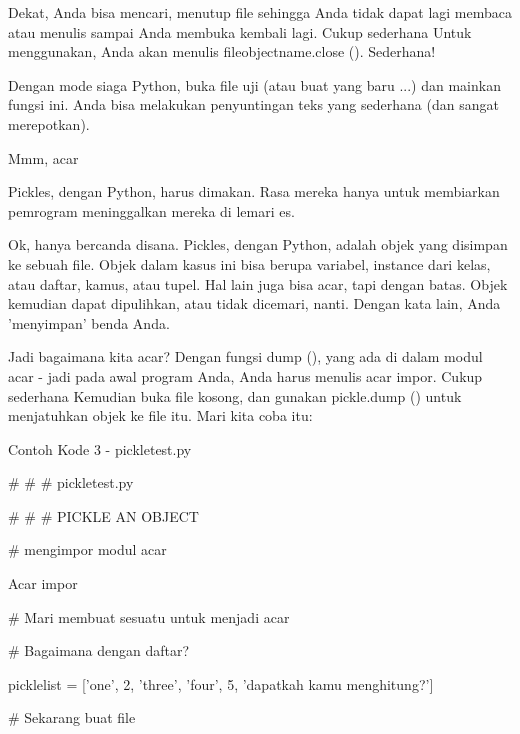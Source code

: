 \vspace{12pt}
Dekat, Anda bisa mencari, menutup file sehingga Anda tidak dapat lagi membaca atau menulis sampai Anda membuka kembali lagi. Cukup sederhana Untuk menggunakan, Anda akan menulis fileobjectname.close (). Sederhana! \par
\vspace{12pt}
Dengan mode siaga Python, buka file uji (atau buat yang baru ...) dan mainkan fungsi ini. Anda bisa melakukan penyuntingan teks yang sederhana (dan sangat merepotkan). \par
Mmm, acar \par
\vspace{12pt}
Pickles, dengan Python, harus dimakan. Rasa mereka hanya untuk membiarkan pemrogram meninggalkan mereka di lemari es. \par
\vspace{12pt}
Ok, hanya bercanda disana. Pickles, dengan Python, adalah objek yang disimpan ke sebuah file. Objek dalam kasus ini bisa berupa variabel, instance dari kelas, atau daftar, kamus, atau tupel. Hal lain juga bisa acar, tapi dengan batas. Objek kemudian dapat dipulihkan, atau tidak dicemari, nanti. Dengan kata lain, Anda 'menyimpan' benda Anda. \par
\vspace{12pt}
Jadi bagaimana kita acar? Dengan fungsi dump (), yang ada di dalam modul acar - jadi pada awal program Anda, Anda harus menulis acar impor. Cukup sederhana Kemudian buka file kosong, dan gunakan pickle.dump () untuk menjatuhkan objek ke file itu. Mari kita coba itu: \par
Contoh Kode 3 - pickletest.py \par
\vspace{12pt}
 $  \#  $ $  \#  $ $  \#  $ pickletest.py \par
 $  \#  $ $  \#  $ $  \#  $ PICKLE AN OBJECT \par
\vspace{12pt}
 $  \#  $ mengimpor modul acar \par
Acar impor \par
\vspace{12pt}
 $  \#  $ Mari membuat sesuatu untuk menjadi acar \par
 $  \#  $ Bagaimana dengan daftar? \par
picklelist = ['one', 2, 'three', 'four', 5, 'dapatkah kamu menghitung?'] \par
\vspace{12pt}
 $  \#  $ Sekarang buat file \par
